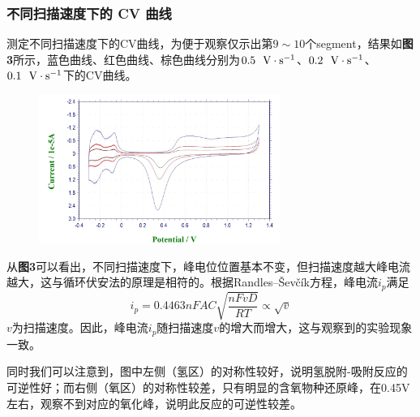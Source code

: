 \documentclass[12pt]{article}
\begin{document}
 			\subsubsection{不同扫描速度下的 CV 曲线}
			 测定不同扫描速度下的CV曲线，为便于观察仅示出第$9\sim 10$个segment，结果如\textbf{图3}所示，蓝色曲线、红色曲线、棕色曲线分别为$0.5\ \ {\rm V\cdot s^{-1}}$、$0.2\ \ {\rm V\cdot s^{-1}}$、$0.1\ \ {\rm V\cdot s^{-1}}$下的CV曲线。
		 	\begin{figure}[h]
				\centering
				\includegraphics[width=0.7\textwidth]{3.png}
			\end{figure}
			\par
			从\textbf{图3}可以看出，不同扫描速度下，峰电位位置基本不变，但扫描速度越大峰电流越大，这与循环伏安法的原理是相符的。根据Randles–Ševčík方程，峰电流$i_{p}$满足
			$$
			i_{p}=0.4463 n F A C\sqrt{\frac{nFvD}{RT}}\propto\sqrt{v}
			$$
			$v$为扫描速度。因此，峰电流$i_{p}$随扫描速度$v$的增大而增大，这与观察到的实验现象一致。\par
			同时我们可以注意到，图中左侧（氢区）的对称性较好，说明氢脱附-吸附反应的可逆性好；而右侧（氧区）的对称性较差，只有明显的含氧物种还原峰，在0.45V左右，观察不到对应的氧化峰，说明此反应的可逆性较差。
\end{document}
